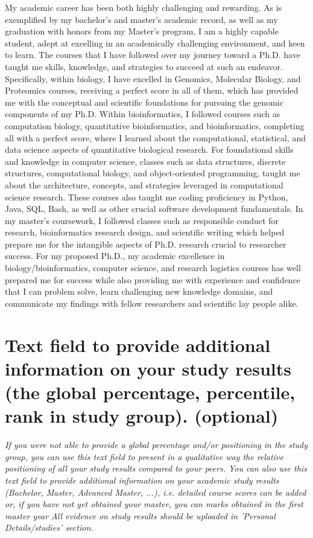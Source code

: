 {My academic career has been both highly challenging and rewarding. 
As is exemplified by my bachelor's and master's academic record, as well as my graduation with honors from my Master's program, I am a highly capable student, adept at excelling in an academically challenging environment, and keen to learn.
The courses that I have followed over my journey toward a Ph.D. have taught me skills, knowledge, and strategies to succeed at such an endeavor.
Specifically, within biology, I have excelled in Genomics, Molecular Biology, and Proteomics courses, receiving a perfect score in all of them, which has provided me with the conceptual and scientific foundations for pursuing the genomic components of my Ph.D. 
Within bioinformatics, I followed courses such as computation biology, quantitative bioinformatics, and bioinformatics, completing all with a perfect score, where I learned about the computational, statistical, and data science aspects of quantitative biological research. 
For foundational skills and knowledge in computer science, classes such as data structures, discrete structures, computational biology, and object-oriented programming, taught me about the architecture, concepts, and strategies leveraged in computational science research.
These courses also taught me coding proficiency in Python, Java, SQL, Bash, as well as other crucial software development fundamentals. 
In my master's coursework, I followed classes such as responsible conduct for research, bioinformatics research design, and scientific writing which helped prepare me for the intangible aspects of Ph.D. research crucial to researcher success.
For my proposed Ph.D., my academic excellence in biology/bioinformatics, computer science, and research logistics courses has well prepared me for success while also providing me with experience and confidence that I can problem solve, learn challenging new knowledge domains, and communicate my findings with fellow researchers and scientific lay people alike.



\section{Text field to provide additional information on your study results (the global percentage, percentile, rank in study group). (optional)}
\textit{
If you were not able to provide a global percentage and/or positioning in the study group, you can use this text field to present in a qualitative way the relative positioning of all your study results compared to your peers. You can also use this text field to provide additional information on your academic study results (Bachelor, Master, Advanced Master, ...), i.e. detailed course scores can be added or, if you have not yet obtained your master, you can marks obtained in the first master year All evidence on study results should be uploaded in 'Personal Details/studies' section.
}

}
